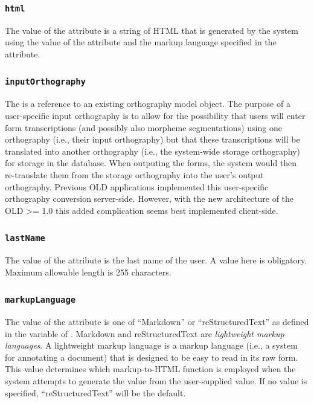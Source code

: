 \documentclass[letterpaper,10pt,english]{sphinxmanual}
\begin{document}
\subsubsection{\texttt{html}}
\label{datastructure:id59}
The value of the  attribute is a string of HTML that is generated by the
system using the value of the  attribute and the markup language
specified in the  attribute.


\subsubsection{\texttt{inputOrthography}}
\label{datastructure:id60}
The  is a reference to an existing orthography model object.
The purpose of a user-specific input orthography is to allow for the possibility
that users will enter form transcriptions (and possibly also morpheme
segmentations) using one orthography (i.e., their input orthography) but that
these transcriptions will be translated into another orthography (i.e., the
system-wide storage orthography) for storage in the database.  When outputing
the forms, the system would then re-translate them from the storage orthography
into the user's output orthography.  Previous OLD applications implemented this
user-specific orthography conversion server-side.  However, with the new
architecture of the OLD \textgreater{}= 1.0 this added complication seems best implemented
client-side.


\subsubsection{\texttt{lastName}}
\label{datastructure:id61}
The value of the  attribute is the last name of the user.  A value
here is obligatory.  Maximum allowable length is 255 characters.


\subsubsection{\texttt{markupLanguage}}
\label{datastructure:id62}
The value of the  attribute is one of ``Markdown'' or
``reStructuredText'' as defined in the  variable of
.  Markdown and reStructuredText are \emph{lightweight markup
languages}.  A lightweight markup language is a markup language (i.e., a system
for annotating a document) that is designed to be easy to read in its raw form.
This value determines which markup-to-HTML function is employed when the system
attempts to generate the  value from the user-supplied 
value.  If no value is specified, ``reStructuredText'' will be the default.
\end{document}
